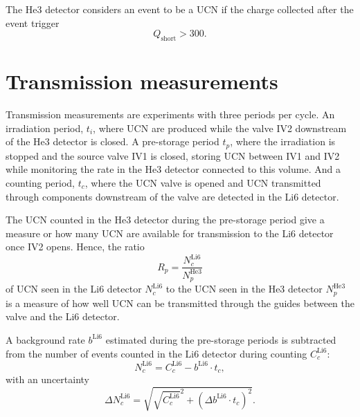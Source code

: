 \documentclass[10pt,letterpaper]{article}
\begin{document}
The He3 detector considers an event to be a UCN if the charge collected after the event trigger
\begin{equation}
Q_\mathrm{short} > 300.
\end{equation}




\section{Transmission measurements}

Transmission measurements are experiments with three periods per cycle. An irradiation period, $t_i$, where UCN are produced while the valve IV2 downstream of the He3 detector is closed. A pre-storage period $t_p$, where the irradiation is stopped and the source valve IV1 is closed, storing UCN between IV1 and IV2 while monitoring the rate in the He3 detector connected to this volume. And a counting period, $t_c$, where the UCN valve is opened and UCN transmitted through components downstream of the valve are detected in the Li6 detector.

The UCN counted in the He3 detector during the pre-storage period give a measure or how many UCN are available for transmission to the Li6 detector once IV2 opens. Hence, the ratio
\begin{equation}
R_p = \frac{N^\mathrm{Li6}_c}{N^\mathrm{He3}_p}
\end{equation}
of UCN seen in the Li6 detector $N^\mathrm{Li6}_c$ to the UCN seen in the He3 detector $N^\mathrm{He3}_p$ is a measure of how well UCN can be transmitted through the guides between the valve and the Li6 detector.

A background rate $b^\mathrm{Li6}$ estimated during the pre-storage periods is subtracted from the number of events counted in the Li6 detector during counting $C^\mathrm{Li6}_c$:
\begin{equation}
\label{eq:transmission_begin}
N^\mathrm{Li6}_c = C^\mathrm{Li6}_c - b^\mathrm{Li6} \cdot t_c,
\end{equation}
with an uncertainty
\begin{equation}
\label{eq:background_subtraction_end}
\Delta N^\mathrm{Li6}_c = \sqrt{ \sqrt{C^\mathrm{Li6}_c}^2 + \left( \Delta b^\mathrm{Li6} \cdot t_c \right)^2}.
\end{equation}
\end{document}
